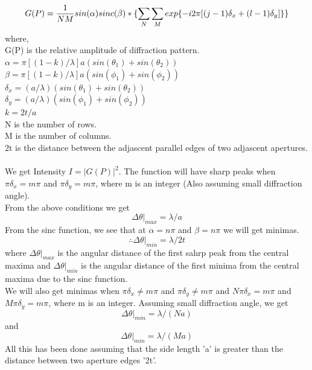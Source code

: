 \documentclass[12pt]{report}
\begin{document}
$$ G(P) = \frac{1}{NM}sin(\alpha)sinc(\beta) * \Large\{ \large\sum_{N} \large\sum_{M} exp\{-i2\pi [(j-1)\delta_x + (l-1)\delta_y]\}\Large\} $$
where,\\
G(P) is the relative amplitude of diffraction pattern.\\
$\alpha = \pi [(1-k)/\lambda]a(sin(\theta_1)+sin(\theta_2))$\\
$\beta = \pi [(1-k)/\lambda]a(sin(\phi_1)+sin(\phi_2))$\\
$\delta_x = (a/\lambda)(sin(\theta_1)+sin(\theta_2))$\\
$\delta_y = (a/\lambda)(sin(\phi_1)+sin(\phi_2))$\\
$k = 2t/a$\\
N is the number of rows.\\
M is the number of columns.\\
2t is the distance between the adjascent parallel edges of two adjascent apertures.\\\\
We get Intensity $I = |G(P)|^2$. The function will have sharp peaks when $\pi \delta_x = m\pi$ and $\pi \delta_y = m\pi$, where m is an integer (Also assuming small diffraction angle).\\
From the above conditions we get
$$\Delta\theta|_{max} = \lambda/a$$
From the sinc function, we see that at $\alpha = n\pi$ and $\beta = n\pi$ we will get minimas.
$$\therefore \Delta\theta|_{min} = \lambda/2t$$
where $\Delta\theta|_{max}$ is the angular distance of the first sahrp peak from the central maxima and $\Delta\theta|_{min}$ is the angular distance of the first minima from the central maxima due to the sinc function.\\
We will also get minimas when  $\pi \delta_x \neq m\pi$ and $\pi \delta_y \neq m\pi$ and  $N\pi \delta_x = m\pi$ and $M\pi \delta_y = m\pi$, where m is an integer. Assuming small diffraction angle, we get
$$ \Delta\theta|_{min} = \lambda/(Na) $$ and $$ \Delta\theta|_{min} = \lambda/(Ma) $$
All this has been done assuming that the side length 'a' is greater than the distance between two aperture edges '2t'. 
\newpage
\end{document}
